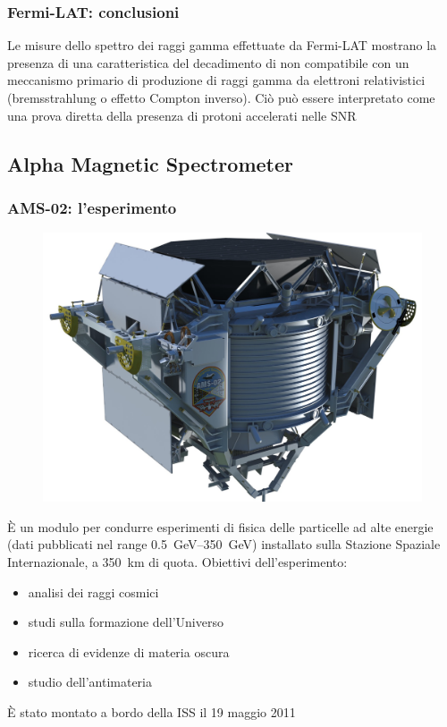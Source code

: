 \documentclass[10pt]{beamer}
\begin{document}
\begin{frame}
  \frametitle{Fermi-LAT: conclusioni}
  Le misure dello spettro dei raggi gamma effettuate da Fermi-LAT mostrano la
  presenza di una \alert{caratteristica del decadimento di \PGpz} non
  compatibile con un meccanismo primario di produzione di raggi gamma da
  elettroni relativistici (bremsstrahlung o effetto Compton inverso).  Ciò può
  essere interpretato come una
  \alert{prova diretta della presenza di protoni accelerati} nelle SNR
\end{frame}

\subsection{Alpha Magnetic Spectrometer}

\begin{frame}
  \frametitle{AMS-02: l'esperimento}
  \begin{figure}
    \centering
    \includegraphics[width=0.3\columnwidth]{ams}
  \end{figure}
  È un modulo per condurre esperimenti di fisica delle particelle ad alte
  energie (dati pubblicati nel range
  \SIrange[range-phrase=--]{0.5}{350}{\giga\electronvolt}) installato sulla
  Stazione Spaziale Internazionale, a \SI{350}{\kilo\metre} di quota.  Obiettivi
  dell'esperimento:
  \begin{itemize}
  \item analisi dei \alert{raggi cosmici}
  \item studi sulla \alert{formazione dell'Universo}
  \item ricerca di evidenze di \alert{materia oscura}
  \item studio dell'\alert{antimateria}
  \end{itemize}
  È stato montato a bordo della ISS il 19 maggio 2011
\end{frame}
\end{document}
